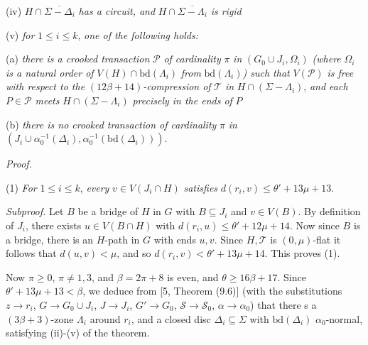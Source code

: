 \hspace*{12pt}(iv) $H \cap \overline{\Sigma - \Delta_i}$ \textit{has a circuit, and} $H \cap \overline{\Sigma - \Lambda_i}$ \textit{is rigid}

\hspace*{12pt}(v) \textit{for} $1 \le i \le k$, \textit{one of the following holds:}

\hspace*{12pt}(a) \textit{there is a crooked transaction} $\mathcal{P}$ \textit{of cardinality} $\pi$ \textit{in} $(G_0 \cup J_i, \Omega_i)$ \textit{(where} $\Omega_i$ \textit{is a natural order of} $V(H) \cap \text{bd}(\Lambda_i)$ \textit{from} $\text{bd}(\Lambda_i)$\textit{) such that} $V(\mathcal{P})$ \textit{is free with respect to the} $(12\beta + 14)$\textit{-compression of} $\mathcal{T}$ \textit{in} $H \cap (\Sigma - \Lambda_i)$, \textit{and each} $P \in \mathcal{P}$ \textit{meets} $H \cap (\Sigma - \Lambda_i)$ \textit{precisely in the ends of} $P$

\hspace*{12pt}(b) \textit{there is no crooked transaction of cardinality} $\pi$ \textit{in} $(J_i \cup \alpha_0^{-1}(\Delta_i), \alpha_0^{-1}(\text{bd}(\Delta_i)))$.

\textit{Proof.}

\hspace*{12pt}(1) \textit{For} $1 \le i \le k$, \textit{every} $v \in V(J_i \cap H)$ \textit{satisfies} $d(r_i, v) \le \theta' + 13\mu + 13$.

\textit{Subproof.} Let $B$ be a bridge of $H$ in $G$ with $B \subseteq J_i$ and $v \in V(B)$. By definition of $J_i$, there exists $u \in V(B \cap H)$ with $d(r_i, u) \le \theta' + 12\mu + 14$. Now since $B$ is a bridge, there is an $H$-path in $G$ with ends $u, v$. Since $H, \mathcal{T}$ is $(0, \mu)$-flat it follows that $d(u, v) < \mu$, and so $d(r_i, v) < \theta' + 13\mu + 14$. This proves (1).

Now $\pi \ge 0$, $\pi \ne 1, 3$, and $\beta = 2\pi + 8$ is even, and $\theta \ge 16\beta + 17$. Since $\theta' + 13\mu + 13 < \beta$, we deduce from [5, Theorem (9.6)] (with the substitutions $z \to r_i$, $G \to G_0 \cup J_i$, $J \to J_i$, $G' \to G_0$, $\mathcal{S} \to \mathcal{S}_0$, $\alpha \to \alpha_0$) that there s a $(3\beta + 3)$-zone $\Lambda_i$ around $r_i$, and a closed disc $\Delta_i \subseteq \Sigma$ with $\text{bd}(\Delta_i)$ $\alpha_0$-normal, satisfying (ii)-(v) of the theorem.
